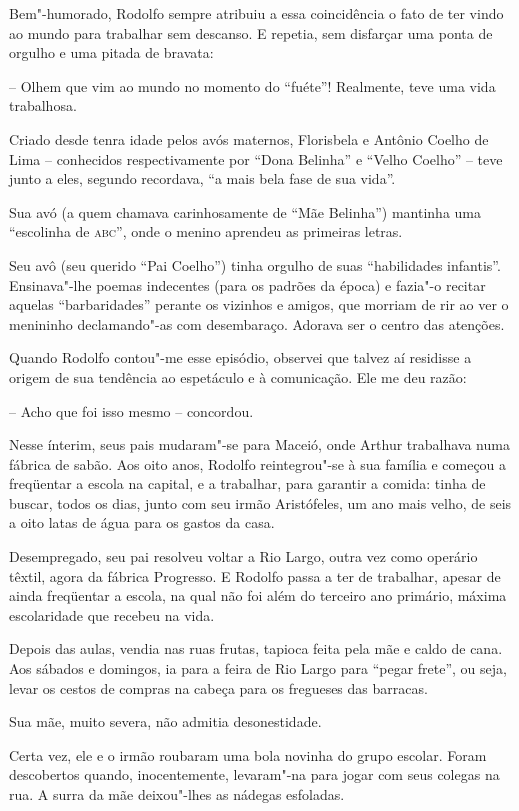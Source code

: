 Bem"-humorado, Rodolfo sempre atribuiu a essa coincidência o fato de
ter vindo ao mundo para trabalhar sem descanso. E repetia, sem
disfarçar uma ponta de orgulho e uma pitada de bravata:

-- Olhem que vim ao mundo no momento do
``fuéte''! Realmente, teve uma vida
trabalhosa.

Criado desde tenra idade pelos avós maternos, Florisbela e Antônio
Coelho de Lima -- conhecidos respectivamente por ``Dona
Belinha'' e ``Velho Coelho''
-- teve junto a eles, segundo recordava, ``a mais bela
fase de sua vida''.

Sua avó (a quem chamava carinhosamente de ``Mãe
Belinha'') mantinha uma ``escolinha de
\textsc{abc}'', onde o menino aprendeu as primeiras letras.

Seu avô (seu querido ``Pai Coelho'') tinha
orgulho de suas ``habilidades infantis''.
Ensinava"-lhe poemas indecentes (para os padrões da época) e fazia"-o
recitar aquelas ``barbaridades'' perante os
vizinhos e amigos, que morriam de rir ao ver o menininho
declamando"-as com desembaraço. Adorava ser o centro das atenções.

Quando Rodolfo contou"-me esse episódio, observei que talvez aí
residisse a origem de sua tendência ao espetáculo e à comunicação. Ele
me deu razão:

-- Acho que foi isso mesmo -- concordou.

Nesse ínterim, seus pais mudaram"-se para Maceió, onde Arthur
trabalhava numa fábrica de sabão. Aos oito anos, Rodolfo
reintegrou"-se à sua família e começou a freqüentar a escola na
capital, e a trabalhar, para garantir a comida: tinha de buscar, todos
os dias, junto com seu irmão Aristófeles, um ano mais velho, de seis a
oito latas de água para os gastos da casa.

Desempregado, seu pai resolveu voltar a Rio Largo, outra vez como
operário têxtil, agora da fábrica Progresso. E Rodolfo passa a ter de
trabalhar, apesar de ainda freqüentar a escola, na qual não foi além do
terceiro ano primário, máxima escolaridade que recebeu na vida.

Depois das aulas, vendia nas ruas frutas, tapioca feita pela mãe e
caldo de cana. Aos sábados e domingos, ia para a feira de Rio Largo
para ``pegar frete'', ou seja, levar os
cestos de compras na cabeça para os fregueses das barracas.

Sua mãe, muito severa, não admitia desonestidade.

Certa vez, ele e o irmão roubaram uma bola novinha do grupo escolar.
Foram descobertos quando, inocentemente, levaram"-na para jogar com
seus colegas na rua. A surra da mãe deixou"-lhes as nádegas esfoladas.


